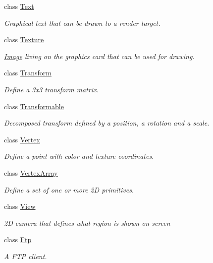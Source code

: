 \begin{DoxyCompactItemize}
class \hyperlink{classsf_1_1_text}{Text}
\begin{DoxyCompactList}\small\item\em Graphical text that can be drawn to a render target. \end{DoxyCompactList}\item 
class \hyperlink{classsf_1_1_texture}{Texture}
\begin{DoxyCompactList}\small\item\em \hyperlink{classsf_1_1_image}{Image} living on the graphics card that can be used for drawing. \end{DoxyCompactList}\item 
class \hyperlink{classsf_1_1_transform}{Transform}
\begin{DoxyCompactList}\small\item\em Define a 3x3 transform matrix. \end{DoxyCompactList}\item 
class \hyperlink{classsf_1_1_transformable}{Transformable}
\begin{DoxyCompactList}\small\item\em Decomposed transform defined by a position, a rotation and a scale. \end{DoxyCompactList}\item 
class \hyperlink{classsf_1_1_vertex}{Vertex}
\begin{DoxyCompactList}\small\item\em Define a point with color and texture coordinates. \end{DoxyCompactList}\item 
class \hyperlink{classsf_1_1_vertex_array}{Vertex\-Array}
\begin{DoxyCompactList}\small\item\em Define a set of one or more 2\-D primitives. \end{DoxyCompactList}\item 
class \hyperlink{classsf_1_1_view}{View}
\begin{DoxyCompactList}\small\item\em 2\-D camera that defines what region is shown on screen \end{DoxyCompactList}\item 
class \hyperlink{classsf_1_1_ftp}{Ftp}
\begin{DoxyCompactList}\small\item\em A F\-T\-P client. \end{DoxyCompactList}\item 

\end{DoxyCompactItemize}
